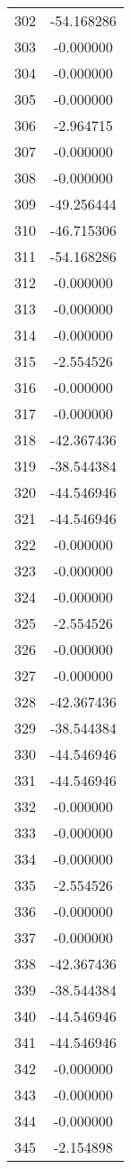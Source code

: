 \documentclass[12pt]{article}
\begin{document}
\begin{longtable}{@{}cc@{}}
302 & -54.168286 \\
303 & -0.000000 \\
304 & -0.000000 \\
305 & -0.000000 \\
306 & -2.964715 \\
307 & -0.000000 \\
308 & -0.000000 \\
309 & -49.256444 \\
310 & -46.715306 \\
311 & -54.168286 \\
312 & -0.000000 \\
313 & -0.000000 \\
314 & -0.000000 \\
315 & -2.554526 \\
316 & -0.000000 \\
317 & -0.000000 \\
318 & -42.367436 \\
319 & -38.544384 \\
320 & -44.546946 \\
321 & -44.546946 \\
322 & -0.000000 \\
323 & -0.000000 \\
324 & -0.000000 \\
325 & -2.554526 \\
326 & -0.000000 \\
327 & -0.000000 \\
328 & -42.367436 \\
329 & -38.544384 \\
330 & -44.546946 \\
331 & -44.546946 \\
332 & -0.000000 \\
333 & -0.000000 \\
334 & -0.000000 \\
335 & -2.554526 \\
336 & -0.000000 \\
337 & -0.000000 \\
338 & -42.367436 \\
339 & -38.544384 \\
340 & -44.546946 \\
341 & -44.546946 \\
342 & -0.000000 \\
343 & -0.000000 \\
344 & -0.000000 \\
345 & -2.154898 \\

\end{longtable}
\end{document}
